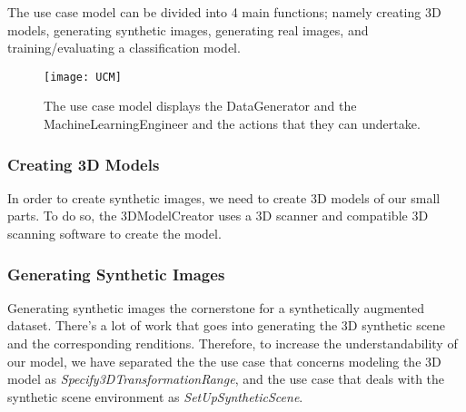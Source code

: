 The use case model can be divided into 4 main functions; namely creating 3D models, generating synthetic images, generating real images, and training/evaluating a classification model.

\begin{figure}[h]
\centering
  \texttt{[image: UCM]}
\caption{The use case model displays the DataGenerator and the MachineLearningEngineer and the actions that they can undertake.}
\label{fig:UCM}
\end{figure}

\clearpage
\subsubsection{Creating 3D Models}
In order to create synthetic images, we need to create 3D models of our small parts. To do so, the 3DModelCreator uses a 3D scanner and compatible 3D scanning software to create the model.

\begin{usecase}





\end{usecase}

\newpage
\subsubsection{Generating Synthetic Images}
Generating synthetic images the cornerstone for a synthetically augmented dataset. There's a lot of work that goes into generating the 3D synthetic scene and the corresponding renditions. Therefore, to increase the understandability of our model, we have separated the the use case that concerns modeling the 3D model as \textit{Specify3DTransformationRange}, and the use case that deals with the synthetic scene environment as \textit{SetUpSyntheticScene}.

